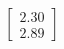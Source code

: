 \documentclass[preview]{standalone}
\begin{document}
\begin{align*}
\begin{bmatrix} 2.30 \\ 2.89 \end{bmatrix}
\end{align*}
\end{document}
